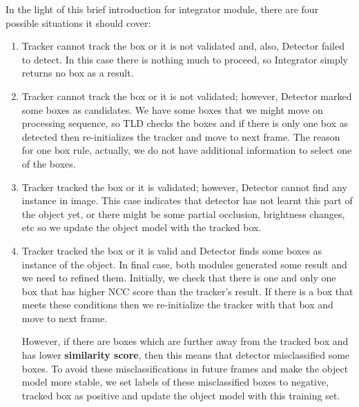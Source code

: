 \documentclass{report}
\begin{document}
            In the light of this brief introduction for integrator module, there are four possible situations it should cover:
            \begin{enumerate}
                \item Tracker cannot track the box or it is not validated and, also, Detector failed to detect.
                    In this case there is nothing much to proceed, so Integrator simply returns no box as a result.
                \item Tracker cannot track the box or it is not validated; however, Detector marked some boxes as candidates.
                    We have some boxes that we might move on processing sequence, so TLD checks the boxes and if there is only one
                    box as detected then re-initializes the tracker and move to next frame. The reason for one box rule, actually,
                    we do not have additional information to select one of the boxes.
                \item Tracker tracked the box or it is validated; however, Detector cannot find any instance in image.
                    This case indicates that detector has not learnt this part of the object yet, or there might be some
                    partial occlusion, brightness changes, etc so we update the object model with the tracked box.
                \item Tracker tracked the box or it is valid and Detector finds some boxes as instance of the object.
                    In final case, both modules generated some result and we need to refined them. Initially, we check that there is one
                    and only one box that has higher NCC score than the tracker's result. If there is a box that meets these conditions
                    then we re-initialize the tracker with that box and move to next frame.

                    However, if there are boxes which are further away from the tracked box and has lower \textbf{similarity score},
                    then this means that detector misclassified some boxes. To avoid these misclassifications in future frames and
                    make the object model more stable, we set labels of these misclassified boxes to negative,
                    tracked box as positive and update the object model with this training set.
            \end{enumerate}
\end{document}
